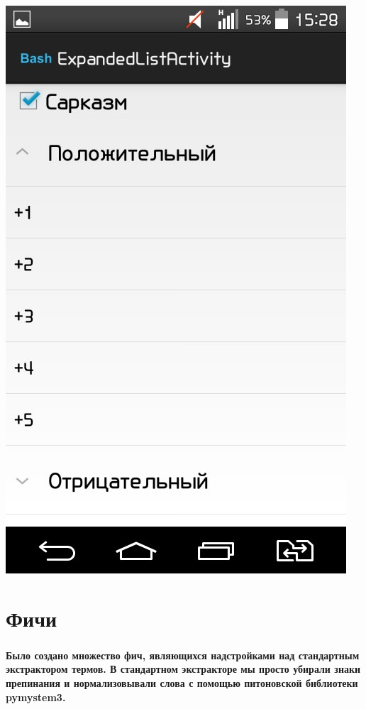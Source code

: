 \documentclass[t]{beamer}
\begin{document}
\begin{frame}
{		\includegraphics[scale = 0.17]{images/Bash3.jpg}}
	\end{frame}


	\section{Фичи}
    \begin{frame}
    	\frametitle{\insertsection}
        \textbf{Было создано множество фич, являющихся надстройками над стандартным экстрактором термов. В стандартном экстракторе мы просто убирали знаки препинания и нормализовывали слова с помощью питоновской библиотеки pymystem3.}
    \end{frame}
\end{document}
